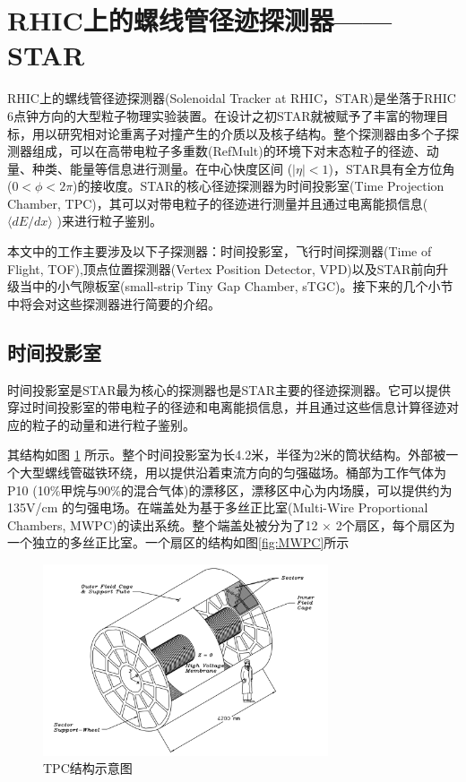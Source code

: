 \section{RHIC上的螺线管径迹探测器——STAR}
RHIC上的螺线管径迹探测器(Solenoidal Tracker at RHIC，STAR)是坐落于RHIC 6点钟方向的大型粒子物理实验装置。在设计之初STAR就被赋予了丰富的物理目标，用以研究相对论重离子对撞产生的介质以及核子结构。整个探测器由多个子探测器组成，可以在高带电粒子多重数(RefMult)的环境下对末态粒子的径迹、动量、种类、能量等信息进行测量。在中心快度区间 ($|\eta| < 1 $)，STAR具有全方位角 ($ 0 < \phi < 2\pi$)的接收度。STAR的核心径迹探测器为时间投影室(Time Projection Chamber, TPC)，其可以对带电粒子的径迹进行测量并且通过电离能损信息($ \langle dE/dx \rangle $ )来进行粒子鉴别。

本文中的工作主要涉及以下子探测器：时间投影室，飞行时间探测器(Time of Flight, TOF),顶点位置探测器(Vertex Position Detector, VPD)以及STAR前向升级当中的小气隙板室(small-strip Tiny Gap Chamber, sTGC)。接下来的几个小节中将会对这些探测器进行简要的介绍。

\subsection{时间投影室}
\label{chap:TPC}
时间投影室是STAR最为核心的探测器也是STAR主要的径迹探测器。它可以提供穿过时间投影室的带电粒子的径迹和电离能损信息，并且通过这些信息计算径迹对应的粒子的动量和进行粒子鉴别。

其结构如图 \ref{fig:TPC} 所示。整个时间投影室为长4.2米，半径为2米的筒状结构。外部被一个大型螺线管磁铁环绕，用以提供沿着束流方向的匀强磁场。桶部为工作气体为P10 (10\%甲烷与90\%的混合气体)的漂移区，漂移区中心为内场膜，可以提供约为 135V/cm 的匀强电场。在端盖处为基于多丝正比室(Multi-Wire Proportional Chambers, MWPC)的读出系统。整个端盖处被分为了12 $\times$ 2个扇区，每个扇区为一个独立的多丝正比室。一个扇区的结构如图\ref{fig:MWPC}所示
\begin{figure}[htb]
    \begin{center}
    \includegraphics[width=0.75\textwidth,clip]{figures/Chapter2/TPC.png}
    \end{center}
    \caption[TPC结构示意图]{TPC结构示意图}
    \label{fig:TPC}
\end{figure}

